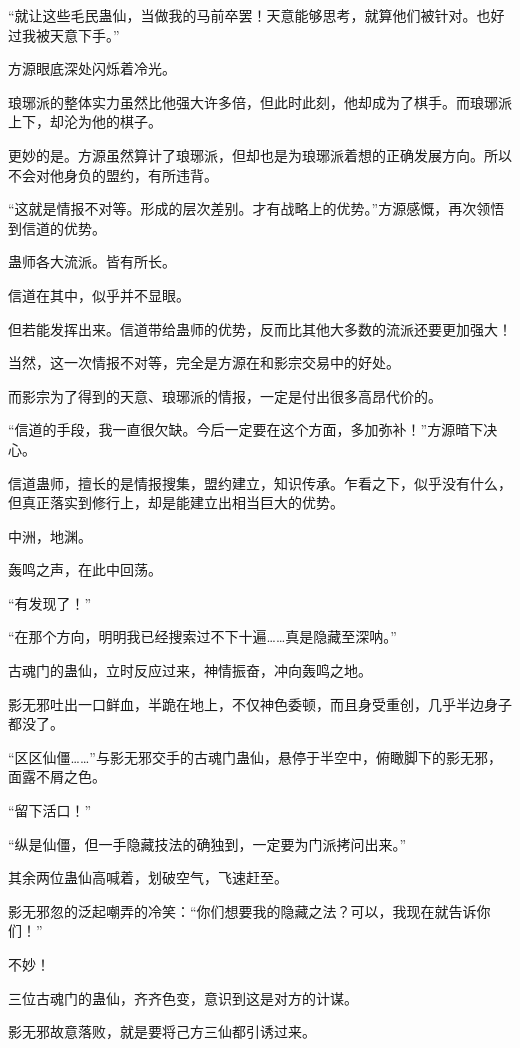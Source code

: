 \begin{this_body}
“就让这些毛民蛊仙，当做我的马前卒罢！天意能够思考，就算他们被针对。也好过我被天意下手。”

方源眼底深处闪烁着冷光。

琅琊派的整体实力虽然比他强大许多倍，但此时此刻，他却成为了棋手。而琅琊派上下，却沦为他的棋子。

更妙的是。方源虽然算计了琅琊派，但却也是为琅琊派着想的正确发展方向。所以不会对他身负的盟约，有所违背。

“这就是情报不对等。形成的层次差别。才有战略上的优势。”方源感慨，再次领悟到信道的优势。

蛊师各大流派。皆有所长。

信道在其中，似乎并不显眼。

但若能发挥出来。信道带给蛊师的优势，反而比其他大多数的流派还要更加强大！

当然，这一次情报不对等，完全是方源在和影宗交易中的好处。

而影宗为了得到的天意、琅琊派的情报，一定是付出很多高昂代价的。

“信道的手段，我一直很欠缺。今后一定要在这个方面，多加弥补！”方源暗下决心。

信道蛊师，擅长的是情报搜集，盟约建立，知识传承。乍看之下，似乎没有什么，但真正落实到修行上，却是能建立出相当巨大的优势。

中洲，地渊。

轰鸣之声，在此中回荡。

“有发现了！”

“在那个方向，明明我已经搜索过不下十遍……真是隐藏至深呐。”

古魂门的蛊仙，立时反应过来，神情振奋，冲向轰鸣之地。

影无邪吐出一口鲜血，半跪在地上，不仅神色委顿，而且身受重创，几乎半边身子都没了。

“区区仙僵……”与影无邪交手的古魂门蛊仙，悬停于半空中，俯瞰脚下的影无邪，面露不屑之色。

“留下活口！”

“纵是仙僵，但一手隐藏技法的确独到，一定要为门派拷问出来。”

其余两位蛊仙高喊着，划破空气，飞速赶至。

影无邪忽的泛起嘲弄的冷笑：“你们想要我的隐藏之法？可以，我现在就告诉你们！”

不妙！

三位古魂门的蛊仙，齐齐色变，意识到这是对方的计谋。

影无邪故意落败，就是要将己方三仙都引诱过来。


\end{this_body}
